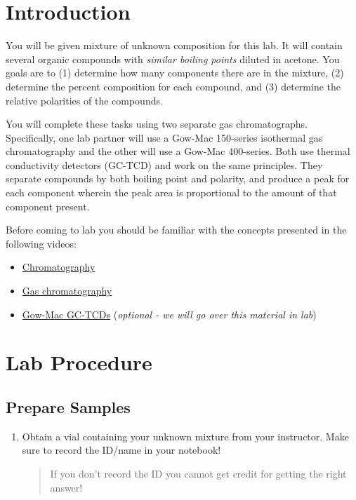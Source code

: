\documentclass[]{tufte-book}
\providecommand{\tightlist}{%
  \setlength{\itemsep}{0pt}\setlength{\parskip}{0pt}}
\begin{document}
\hypertarget{introduction}{%
\section*{Introduction}\label{introduction}}

You will be given mixture of unknown composition for this lab. It will contain several organic compounds with \emph{similar boiling points} diluted in acetone. You goals are to (1) determine how many components there are in the mixture, (2) determine the percent composition for each compound, and (3) determine the relative polarities of the compounds.

You will complete these tasks using two separate gas chromatographs. Specifically, one lab partner will use a Gow-Mac 150-series isothermal gas chromatography and the other will use a Gow-Mac 400-series. Both use thermal conductivity detectors (GC-TCD) and work on the same principles. They separate compounds by both boiling point and polarity, and produce a peak for each component wherein the peak area is proportional to the amount of that component present.

Before coming to lab you should be familiar with the concepts presented in the following videos:

\begin{itemize}
\tightlist
\item
  \href{https://www.youtube.com/watch?v=SnbXQTTHGs4}{Chromatography}
\item
  \href{https://www.youtube.com/watch?v=4Xaa9WdXVTM}{Gas chromatography}\\
\item
  \href{https://youtu.be/0fxH9WRKigw}{Gow-Mac GC-TCDs} (\emph{optional - we will go over this material in lab})
\end{itemize}

\hypertarget{lab-procedure}{%
\section{Lab Procedure}\label{lab-procedure}}

\hypertarget{prepare-samples}{%
\subsection{Prepare Samples}\label{prepare-samples}}

\begin{enumerate}
\def\labelenumi{\arabic{enumi}.}
\item
  Obtain a vial containing your unknown mixture from your instructor. Make sure to record the ID/name in your notebook!

  \begin{quote}
  If you don't record the ID you cannot get credit for getting the right answer!
  \end{quote}
\end{enumerate}
\end{document}
